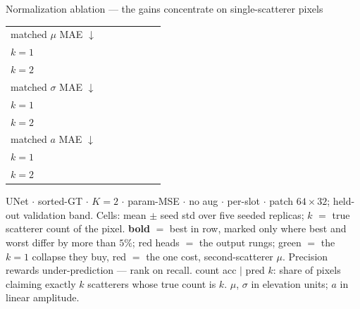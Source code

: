 \begin{frame}{Normalization ablation --- the gains concentrate on single-scatterer pixels}
\begin{tabular}{@{}l c c c !{\hspace{4pt}} c c c@{}}
    \addlinespace
    matched $\mu$ MAE $\downarrow$ &  &  &  &  &  &  \\
    \quad $k{=}1$                &  &  &  &  &  &  \\
    \quad $k{=}2$                &  &  &  &  &  &  \\
    \addlinespace
    matched $\sigma$ MAE $\downarrow$ &  &  &  &  &  &  \\
    \quad $k{=}1$                &  &  &  &  &  &  \\
    \quad $k{=}2$                &  &  &  &  &  &  \\
    \addlinespace
    matched $a$ MAE $\downarrow$ &  &  &  &  &  &  \\
    \quad $k{=}1$                &  &  &  &  &  &  \\
    \quad $k{=}2$                &  &  &  &  &  &  \\
    \bottomrule
  \end{tabular}
  \par\vspace{3pt}
  \parbox{0.86\textwidth}{\tiny\color{soft} UNet $\cdot$ sorted-GT $\cdot$ $K{=}2$ $\cdot$ param-MSE $\cdot$ no aug $\cdot$ per-slot $\cdot$ patch $64{\times}32$; held-out validation band. Cells: mean $\pm$ seed std over five seeded replicas; $k$ $=$ true scatterer count of the pixel. \textbf{bold} $=$ best in row, marked only where best and worst differ by more than $5\%$; \textcolor{accent}{red heads} $=$ the output rungs; \textcolor{good}{green} $=$ the $k{=}1$ collapse they buy, \textcolor{accent}{red} $=$ the one cost, second-scatterer $\mu$. Precision rewards under-prediction --- rank on recall. count acc $\mid$ pred $k$: share of pixels claiming exactly $k$ scatterers whose true count is $k$. $\mu$, $\sigma$ in elevation units; $a$ in linear amplitude.\par}
    

\end{frame}

